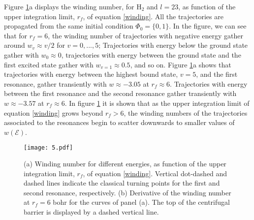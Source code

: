 \documentclass[%
 aip,
 numerical,
 jcp,
 floatfix,
rsi,%
amsmath,amssymb,
reprint,%
author-year%
]{revtex4-1}
\begin{document}
Figure \ref{winding_derivative}a displays the winding number, for $\mathrm{H}_2$ and $l=23$, as function of the upper integration limit,  $r_f$, of equation \eqref{winding}. All the trajectories are propagated from the same initial condition $\Phi_0=\{0,1\}$. In the figure, we can see that for $r_f=6$, the winding number of trajectories with negative energy gather around $w_v\approx v/2$ for $v=0,...,5$; Trajectories with energy below the ground state gather with $w_0\approx 0$, trajectories with energy between the ground state and the first excited state gather with $w_{v=1}\approx0.5$, and so on. Figure \ref{winding_derivative}a shows that trajectories with energy between the highest bound state, $v=5$, and the first resonance, gather transiently with $w\approx -3.05$ at $r_f\approx 6$. Trajectories with energy between the first resonance and the second resonance gather transiently with $w\approx -3.57$ at $r_f\approx 6$. In figure \ref{winding_derivative} it is shown that as the upper integration limit of equation \eqref{winding} grows beyond $r_f>6$, the winding numbers of the trajectories associated to the resonances begin to scatter downwards to smaller values of $w(\mathcal{E})$.

\begin{figure}[h!]
\texttt{[image: 5.pdf]}
\caption{(a) Winding number for different energies, as function of the upper integration limit, $r_f$, of equation \eqref{winding}. Vertical dot-dashed and dashed lines indicate the classical turning points for the first and second resonance, respectively. (b) Derivative of the winding number at $r_{f}=6$ bohr for the curves of panel (a). The top of the centrifugal barrier is displayed by a dashed vertical line.}\label{winding_derivative}
\end{figure}
\end{document}
